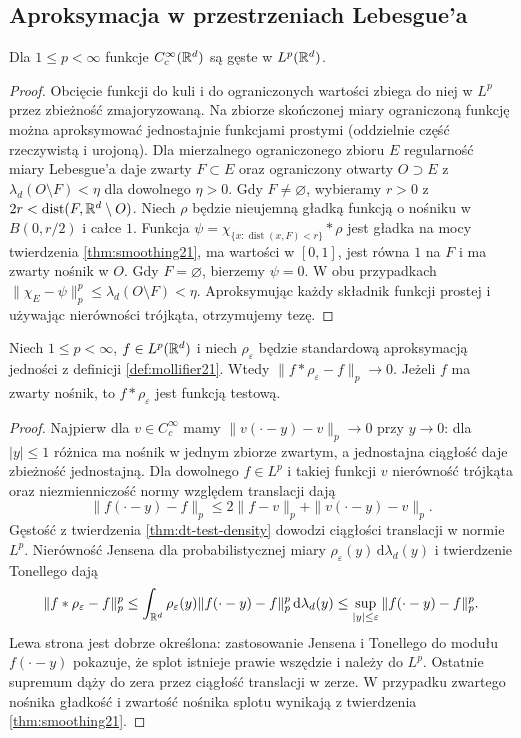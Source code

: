 
\subsection{Aproksymacja w przestrzeniach Lebesgue'a}

\begin{twierdzenie}
\label{thm:dt-test-density}
Dla $1\le p<\infty$ funkcje $C_c^\infty(\mathbb R^d)$
są gęste w $L^p(\mathbb R^d)$.
\end{twierdzenie}
\begin{proof}
Obcięcie funkcji do kuli i do ograniczonych wartości
zbiega do niej w $L^p$ przez zbieżność zmajoryzowaną.
Na zbiorze skończonej miary ograniczoną funkcję
można aproksymować jednostajnie funkcjami prostymi
(oddzielnie część rzeczywistą i urojoną).
Dla mierzalnego ograniczonego zbioru $E$ regularność
miary Lebesgue'a daje zwarty $F\subset E$ oraz
ograniczony otwarty $O\supset E$ z
$\lambda_d(O\setminus F)<\eta$ dla dowolnego $\eta>0$.
Gdy $F\ne\varnothing$, wybieramy $r>0$ z
$2r<\operatorname{dist}(F,\mathbb R^d\setminus O)$.
Niech $\rho$ będzie nieujemną gładką funkcją o nośniku
w $B(0,r/2)$ i całce $1$. Funkcja
$\psi=\chi_{\{x:\operatorname{dist}(x,F)<r\}}*\rho$
jest gładka na mocy twierdzenia \ref{thm:smoothing21},
ma wartości w $[0,1]$, jest równa $1$ na $F$
i ma zwarty nośnik w $O$. Gdy $F=\varnothing$,
bierzemy $\psi=0$. W obu przypadkach
$\|\chi_E-\psi\|_p^p\le\lambda_d(O\setminus F)<\eta$.
Aproksymując każdy składnik funkcji prostej i używając
nierówności trójkąta, otrzymujemy tezę.
\end{proof}

\begin{twierdzenie}
\label{thm:dt-approx-lp}
Niech $1\le p<\infty$, $f\in L^p(\mathbb R^d)$ i niech
$\rho_\varepsilon$ będzie standardową aproksymacją
jedności z definicji \ref{def:mollifier21}.
Wtedy $\|f*\rho_\varepsilon-f\|_p\to0$.
Jeżeli $f$ ma zwarty nośnik, to $f*\rho_\varepsilon$
jest funkcją testową.
\end{twierdzenie}
\begin{proof}
Najpierw dla $v\in C_c^\infty$ mamy
$\|v(\cdot-y)-v\|_p\to0$ przy $y\to0$:
dla $|y|\le1$ różnica ma nośnik w jednym zbiorze
zwartym, a jednostajna ciągłość daje zbieżność
jednostajną. Dla dowolnego $f\in L^p$
i takiej funkcji $v$ nierówność trójkąta
oraz niezmienniczość normy względem translacji dają
\[
 \|f(\cdot-y)-f\|_p\le2\|f-v\|_p+\|v(\cdot-y)-v\|_p.
\]
Gęstość z twierdzenia \ref{thm:dt-test-density}
dowodzi ciągłości translacji w normie $L^p$.
Nierówność Jensena dla probabilistycznej miary
$\rho_\varepsilon(y)\,\mathrm d\lambda_d(y)$
i twierdzenie Tonellego dają
\[
 \|f*\rho_\varepsilon-f\|_p^p
 \le \int_{\mathbb R^d}\rho_\varepsilon(y)
            \|f(\cdot-y)-f\|_p^p\,\mathrm d\lambda_d(y)
 \le\sup_{|y|\le\varepsilon}\|f(\cdot-y)-f\|_p^p.
\]
Lewa strona jest dobrze określona: zastosowanie
Jensena i Tonellego do modułu $f(\cdot-y)$
pokazuje, że splot istnieje prawie wszędzie
i należy do $L^p$. Ostatnie supremum dąży do zera
przez ciągłość translacji w zerze.
W przypadku zwartego nośnika gładkość i zwartość
nośnika splotu wynikają z twierdzenia
\ref{thm:smoothing21}.
\end{proof}

